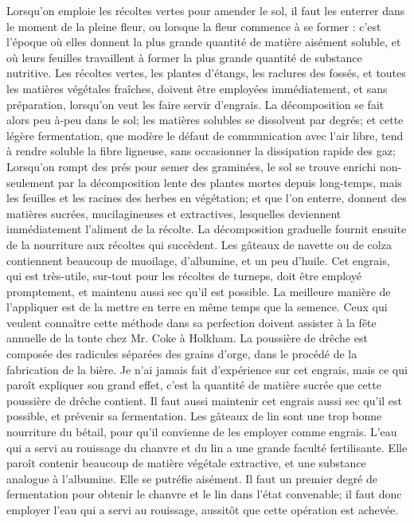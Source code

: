 Lorsqu'on emploie les récoltes vertes pour amender le sol, il faut les enterrer dans le moment de la pleine fleur, ou lorsque la fleur commence à se former : c'est l'époque où elles donnent la plus grande quantité de matière aisément soluble, et où leurs feuilles travaillent à former la plus grande quantité de substance nutritive. Les récoltes vertes, les plantes d'étangs, les raclures des fossés, et toutes les matières végétales fraîches, doivent être employées immédiatement, et sans préparation, lorsqu'on veut les faire servir d'engrais. La décomposition se fait alors peu à-peu dans le sol; les matières solubles se dissolvent par degrés; et cette légère fermentation,\setcounter{page}{159} que modère le défaut de communication avec l'air libre, tend à rendre soluble la fibre ligneuse, sans occasionner la dissipation rapide des gaz;
Lorsqu'on rompt des prés pour semer des graminées, le sol se trouve enrichi non-seulement par la décomposition lente des plantes mortes depuis long-temps, mais les feuilles et les racines des herbes en végétation; et que l'on enterre, donnent des matières sucrées, mucilagineuses et extractives, lesquelles deviennent immédiatement l'aliment de la récolte. La décomposition graduelle fournit ensuite de la nourriture aux récoltes qui succèdent.
Les gâteaux de navette ou de colza contiennent beaucoup de muoilage, d'albumine, et un peu d'huile. Cet engrais, qui est très-utile, sur-tout pour les récoltes de turneps, doit être employé promptement, et maintenu aussi sec qu'il est possible. La meilleure manière de l'appliquer est de la mettre en terre en même temps que la semence. Ceux qui veulent connaître cette méthode dans sa perfection doivent assister à la fête annuelle de la tonte chez Mr. Coke à Holkham.
La poussière de drêche est composée des radicules séparées des grains d'orge, dans le procédé de la fabrication de la bière. Je n'ai\setcounter{page}{160} jamais fait d'expérience sur cet engrais, mais ce qui paroît expliquer son grand effet, c'est la quantité de matière sucrée que cette poussière de drêche contient. Il faut aussi maintenir cet engrais aussi sec qu'il est possible, et prévenir sa fermentation.
Les gâteaux de lin sont une trop bonne nourriture du bétail, pour qu'il convienne de les employer comme engrais. L'eau qui a servi au rouissage du chanvre et du lin a une grande faculté fertilisante. Elle paroît contenir beaucoup de matière végétale extractive, et une substance analogue à l'albumine. Elle se putréfie aisément. Il faut un premier degré de fermentation pour obtenir le chanvre et le lin dans l'état convenable; il faut donc employer l'eau qui a servi au rouissage, aussitôt que cette opération est achevée.
